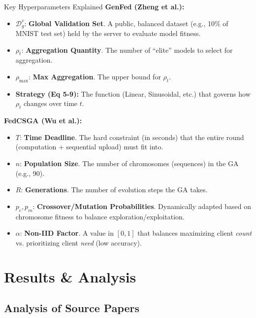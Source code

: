 \documentclass{beamer}
\begin{document}
\begin{frame}{Key Hyperparameters Explained}
\textbf{\textcolor{genfedblue}{GenFed} (Zheng et al.):}
\begin{itemize}
    \item $\mathcal{D}_g^v$: \textbf{Global Validation Set}. A public, balanced dataset (e.g., 10\% of MNIST test set) held by the server to evaluate model fitness.
    \item $\rho_t$: \textbf{Aggregation Quantity}. The number of ``elite'' models to select for aggregation.
    \item $\rho_{\max}$: \textbf{Max Aggregation}. The upper bound for $\rho_t$.
    \item \textbf{Strategy (Eq 5-9):} The function (Linear, Sinusoidal, etc.) that governs how $\rho_t$ changes over time $t$.
\end{itemize}

\textbf{\textcolor{fedcsgaorange}{FedCSGA} (Wu et al.):}
\begin{itemize}
    \item $T$: \textbf{Time Deadline}. The hard constraint (in seconds) that the entire round (computation + sequential upload) must fit into.
    \item $n$: \textbf{Population Size}. The number of chromosomes (sequences) in the GA (e.g., 90).
    \item $R$: \textbf{Generations}. The number of evolution steps the GA takes.
    \item $p_c, p_m$: \textbf{Crossover/Mutation Probabilities}. Dynamically adapted based on chromosome fitness to balance exploration/exploitation.
    \item $\alpha$: \textbf{Non-IID Factor}. A value in $[0, 1]$ that balances maximizing client \textit{count} vs. prioritizing client \textit{need} (low accuracy).
\end{itemize}
\end{frame}

\section{Results \& Analysis}

\subsection{Analysis of Source Papers}
\end{document}
